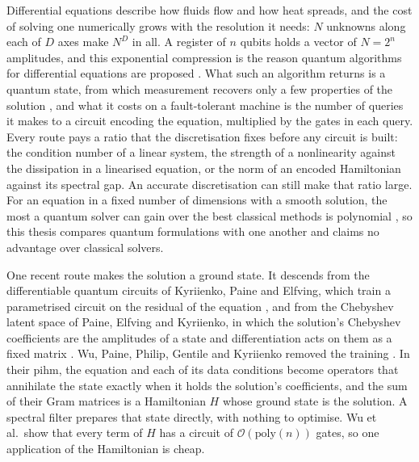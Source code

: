Differential equations describe how fluids flow and how heat spreads, and the cost of solving one numerically grows with the resolution it needs: $N$ unknowns along each of $D$ axes make $N^D$ in all. A register of $n$ qubits holds a vector of $N=2^n$ amplitudes, and this exponential compression is the reason quantum algorithms for differential equations are proposed \cite{berry2014highorder,childsliu2020spectral,liu2021carleman}. What such an algorithm returns is a quantum state, from which measurement recovers only a few properties of the solution \cite{aaronson2015fineprint}, and what it costs on a fault-tolerant machine is the number of queries it makes to a circuit encoding the equation, multiplied by the gates in each query. Every route pays a ratio that the discretisation fixes before any circuit is built: the condition number of a linear system, the strength of a nonlinearity against the dissipation in a linearised equation, or the norm of an encoded Hamiltonian against its spectral gap. An accurate discretisation can still make that ratio large. For an equation in a fixed number of dimensions with a smooth solution, the most a quantum solver can gain over the best classical methods is polynomial \cite{montanaro2016fem}, so this thesis compares quantum formulations with one another and claims no advantage over classical solvers.

One recent route makes the solution a ground state. It descends from the differentiable quantum circuits of Kyriienko, Paine and Elfving, which train a parametrised circuit on the residual of the equation \cite{kyriienko2021differentiable}, and from the Chebyshev latent space of Paine, Elfving and Kyriienko, in which the solution's Chebyshev coefficients are the amplitudes of a state and differentiation acts on them as a fixed matrix \cite{paine2023physicsinformed}. Wu, Paine, Philip, Gentile and Kyriienko removed the training \cite{wu2025pihm}. In their \gls{pihm}, the equation and each of its data conditions become operators that annihilate the state exactly when it holds the solution's coefficients, and the sum of their Gram matrices is a Hamiltonian $H$ whose ground state is the solution. A spectral filter prepares that state directly, with nothing to optimise. Wu et al.\ show that every term of $H$ has a circuit of $\mathcal{O}(\mathrm{poly}(n))$ gates, so one application of the Hamiltonian is cheap.

